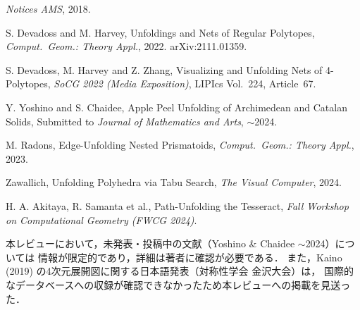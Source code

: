 \documentclass[a4paper,11pt]{article}
\begin{document}
\begin{enumerate}[label={[\arabic*]}, leftmargin=2em]
        \textit{Notices AMS}, 2018.
  \item S. Devadoss and M. Harvey, Unfoldings and Nets of Regular Polytopes,
        \textit{Comput.\ Geom.: Theory Appl.}, 2022. arXiv:2111.01359.
  \item S. Devadoss, M. Harvey and Z. Zhang, Visualizing and Unfolding Nets of 4-Polytopes,
        \textit{SoCG 2022 (Media Exposition)}, LIPIcs Vol.~224, Article~67.
  \item Y. Yoshino and S. Chaidee, Apple Peel Unfolding of Archimedean and Catalan Solids,
        Submitted to \textit{Journal of Mathematics and Arts}, $\sim$2024.
  \item M. Radons, Edge-Unfolding Nested Prismatoids,
        \textit{Comput.\ Geom.: Theory Appl.}, 2023.
  \item Zawallich, Unfolding Polyhedra via Tabu Search,
        \textit{The Visual Computer}, 2024.
  \item H. A. Akitaya, R. Samanta et al., Path-Unfolding the Tesseract,
        \textit{Fall Workshop on Computational Geometry (FWCG 2024)}.
\end{enumerate}

\bigskip
\noindent\small
本レビューにおいて，未発表・投稿中の文献（Yoshino \& Chaidee $\sim$2024）については
情報が限定的であり，詳細は著者に確認が必要である．
また，Kaino (2019) の4次元展開図に関する日本語発表（対称性学会 金沢大会）は，
国際的なデータベースへの収録が確認できなかったため本レビューへの掲載を見送った．
\end{document}
